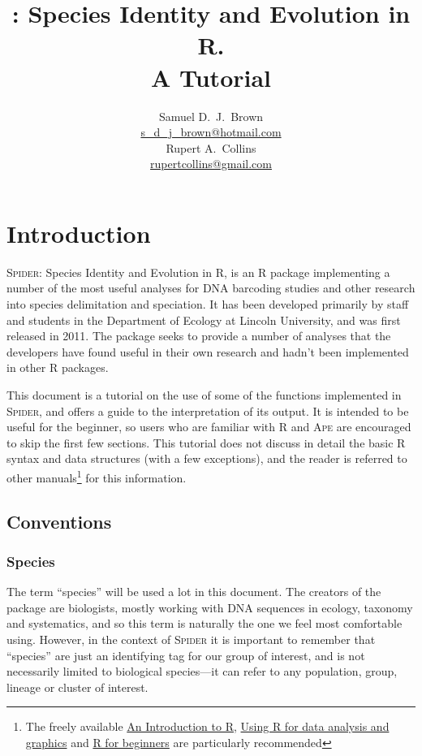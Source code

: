 \documentclass{article}
\title{\Spider: Species Identity and Evolution in R.\\ A Tutorial}
\author{Samuel D.\ J.\ Brown\\\href{mailto:s_d_j_brown@hotmail.com}
{s\_d\_j\_brown@hotmail.com}\\Rupert A.\ Collins\\\href{mailto:rupertcollins@gmail.com}{rupertcollins@gmail.com}}
\newcommand{\Spider}{\textsc{Spider}} %
\newcommand{\progname}[1]{\textsc{#1}}
\begin{document}


\maketitle


\section{Introduction}
\Spider: Species Identity and Evolution in R, is an \progname{R} package implementing a number of the most useful analyses for DNA barcoding studies and other research into species delimitation and speciation. It has been developed primarily by staff and students in the Department of Ecology at Lincoln University, and was first released in 2011. The package seeks to provide a number of analyses that the developers have found useful in their own research and hadn't been implemented in other \progname{R} packages. 

This document is a tutorial on the use of some of the functions implemented in \Spider, and offers a guide to the interpretation of its output. It is intended to be useful for the beginner, so users who are familiar with \progname{R} and \progname{Ape} are encouraged to skip the first few sections. This tutorial does not discuss in detail the basic \progname{R} syntax and data structures (with a few exceptions), and the reader is referred to other manuals\footnote{The freely available \href{http://cran.r-project.org/doc/manuals/R-intro.pdf}{An Introduction to R}, \href{http://cran.r-project.org/doc/contrib/usingR.pdf}{Using R for data analysis and graphics} and \href{http://cran.r-project.org/doc/contrib/Paradis-rdebuts_en.pdf}{R for beginners} are particularly recommended} for this information.

\subsection{Conventions}

\subsubsection{Species}
\label{speciesDef}
The term ``species'' will be used a lot in this document. The creators of the package are biologists, mostly working with DNA sequences in ecology, taxonomy and systematics, and so this term is naturally the one we feel most comfortable using. However, in the context of \progname{Spider} it is important to remember that ``species'' are just an identifying tag for our group of interest, and is not necessarily limited to biological species---it can	refer to any population, group, lineage or cluster of interest. 
\end{document}
